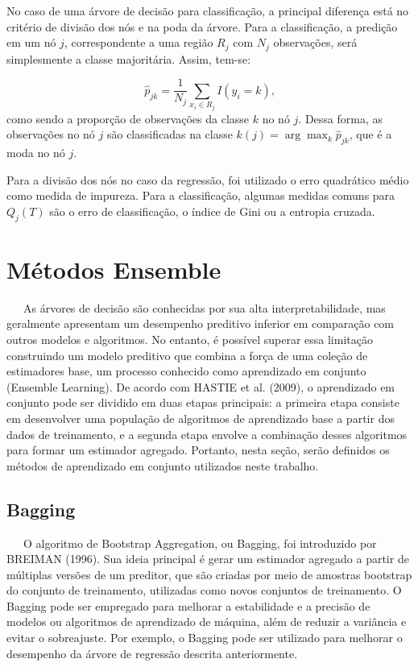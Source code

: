 \documentclass[
  12pt,
  a4paper,
]{scrreprt}
\begin{document}
\vspace{12pt}

No caso de uma árvore de decisão para classificação, a principal
diferença está no critério de divisão dos nós e na poda da árvore. Para
a classificação, a predição em um nó \(j\), correspondente a uma região
\(R_j\) com \(N_j\) observações, será simplesmente a classe majoritária.
Assim, tem-se:

\[
\hat{p}_{jk} = \frac{1}{N_j}\sum_{x_i \in R_j} I\left(y_i = k\right)\text{,}
\] como sendo a proporção de observações da classe \(k\) no nó \(j\).
Dessa forma, as observações no nó \(j\) são classificadas na classe
\(k\left(j\right) = \arg \max_{k} \hat{p}_{jk}\), que é a moda no nó
\(j\).

\vspace{12pt}

Para a divisão dos nós no caso da regressão, foi utilizado o erro
quadrático médio como medida de impureza. Para a classificação, algumas
medidas comuns para \(Q_j\left(T\right)\) são o erro de classificação, o
índice de Gini ou a entropia cruzada.

\section{Métodos Ensemble}\label{muxe9todos-ensemble}

~~~As árvores de decisão são conhecidas por sua alta interpretabilidade,
mas geralmente apresentam um desempenho preditivo inferior em comparação
com outros modelos e algoritmos. No entanto, é possível superar essa
limitação construindo um modelo preditivo que combina a força de uma
coleção de estimadores base, um processo conhecido como aprendizado em
conjunto (Ensemble Learning). De acordo com HASTIE et al. (2009), o
aprendizado em conjunto pode ser dividido em duas etapas principais: a
primeira etapa consiste em desenvolver uma população de algoritmos de
aprendizado base a partir dos dados de treinamento, e a segunda etapa
envolve a combinação desses algoritmos para formar um estimador
agregado. Portanto, nesta seção, serão definidos os métodos de
aprendizado em conjunto utilizados neste trabalho.

\subsection{Bagging}\label{bagging}

~~~O algoritmo de Bootstrap Aggregation, ou Bagging, foi introduzido por
BREIMAN (1996). Sua ideia principal é gerar um estimador agregado a
partir de múltiplas versões de um preditor, que são criadas por meio de
amostras bootstrap do conjunto de treinamento, utilizadas como novos
conjuntos de treinamento. O Bagging pode ser empregado para melhorar a
estabilidade e a precisão de modelos ou algoritmos de aprendizado de
máquina, além de reduzir a variância e evitar o sobreajuste. Por
exemplo, o Bagging pode ser utilizado para melhorar o desempenho da
árvore de regressão descrita anteriormente.
\end{document}
